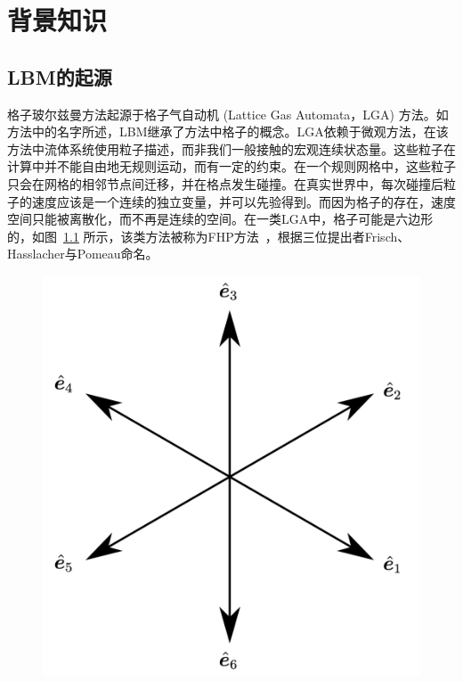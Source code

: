 \chapter{背景知识}
\label{chap:background}

\section{LBM的起源}
\label{sec:2_LBM_origin}
格子玻尔兹曼方法起源于格子气自动机 (Lattice Gas Automata，LGA) 方法。如方法中的名字所述，LBM继承了方法中格子的概念。LGA依赖于微观方法，在该方法中流体系统使用粒子描述，而非我们一般接触的宏观连续状态量。这些粒子在计算中并不能自由地无规则运动，而有一定的约束。在一个规则网格中，这些粒子只会在网格的相邻节点间迁移，并在格点发生碰撞。在真实世界中，每次碰撞后粒子的速度应该是一个连续的独立变量，并可以先验得到。而因为格子的存在，速度空间只能被离散化，而不再是连续的空间。在一类LGA中，格子可能是六边形的，如图~\ref{img:LGA_lattice} 所示，该类方法被称为FHP方法~\citep{frisch1986lattice}，根据三位提出者Frisch、Hasslacher与Pomeau命名。

\begin{figure}[htb]
    \centering
      \includegraphics[width=0.5\columnwidth]{figures/LGA_lattice.png}
    \label{img:LGA_lattice}
\end{figure}

